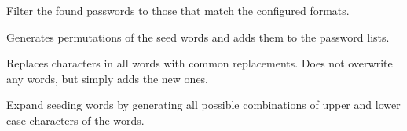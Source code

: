 \documentclass[letterpaper,10pt,english]{sphinxmanual}
\begin{document}
\begin{fulllineitems}
\begin{fulllineitems}
\label{\detokenize{EntroPass:EntroPass.entropass.EntroPass.run_filter}}
\sphinxAtStartPar
Filter the found passwords to those that match the configured formats.

\end{fulllineitems}


\begin{fulllineitems}
\label{\detokenize{EntroPass:EntroPass.entropass.EntroPass.run_permutations}}
\sphinxAtStartPar
Generates permutations of the seed words and adds them to the password lists.

\end{fulllineitems}


\begin{fulllineitems}
\label{\detokenize{EntroPass:EntroPass.entropass.EntroPass.run_replace}}
\sphinxAtStartPar
Replaces characters in all words with common replacements. Does not overwrite any words,
but simply adds the new ones.

\end{fulllineitems}


\begin{fulllineitems}
\label{\detokenize{EntroPass:EntroPass.entropass.EntroPass.run_seeding_expanse}}
\sphinxAtStartPar
Expand seeding words by generating all possible combinations of upper and lower
case characters of the words.

\end{fulllineitems}



\end{fulllineitems}
\end{document}
